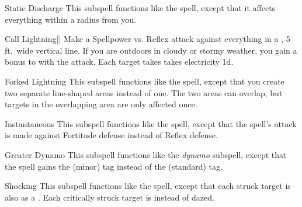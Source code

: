 \begin{ability}[\nth{2}]{Static Discharge}
This subspell functions like the  spell, except that it affects everything within a \areamed radius from you.
\end{ability}
\vspace{0.25em}


\begin{ability}[\nth{3}]{Call Lightning}[]
Make a Spellpower vs. Reflex attack against everything in a \arealarge, 5 ft.\ wide vertical line.
If you are outdoors in cloudy or stormy weather, you gain a  bonus to  with the attack.
\hit Each target takes takes electricity  \plus1d.
\end{ability}
\vspace{0.25em}


\begin{ability}[\nth{3}]{Forked Lightning}
This subspell functions like the  spell, except that you create two separate line-shaped areas instead of one.
The two areas can overlap, but targets in the overlapping area are only affected once.
\end{ability}
\vspace{0.25em}


\begin{ability}[\nth{4}]{Instantaneous}
This subspell functions like the  spell, except that the spell's attack is made against Fortitude defense instead of Reflex defense.
\end{ability}
\vspace{0.25em}


\begin{ability}[\nth{5}]{Greater Dynamo}
This subspell functions like the \textit{dynamo} subspell, except that the spell gains the  (minor) tag instead of the  (standard) tag.
\end{ability}
\vspace{0.25em}


\begin{ability}[\nth{5}]{Shocking}
This subspell functions like the  spell, except that each struck target is also  as a .
Each critically struck target is  instead of dazed.
\end{ability}
\vspace{0.25em}


